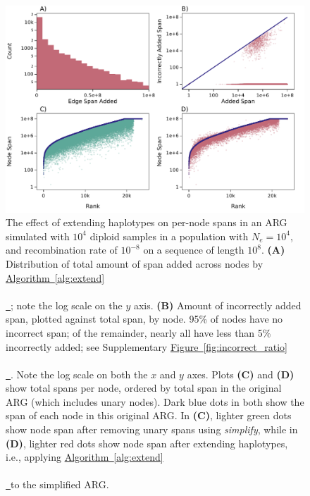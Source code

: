 \documentclass[10pt,twoside,lineno]{gsajnl}
\newcommand{\algorithmref}[2][]{%
	\hyperref[{#2}]{%
		Algorithm~\ref*{#2}%
		\ifx\\#1\\%
		\else
		\,#1%
		\fi
	}%
}
\newcommand*{\figref}[2][]{%
	\hyperref[{#2}]{%
		Figure~\ref*{#2}%
		\ifx\\#1\\%
		\else
		\,#1%
		\fi
	}%
}
\begin{document}
\begin{figure}[!bht]
	\includegraphics[width=\textwidth]{figures/Figure4-plt.pdf}
	\caption{
        The effect of extending haplotypes on per-node spans
        in an ARG simulated with $10^4$ diploid samples in a population with $N_e=10^4$,
        and recombination rate of $10^{-8}$ on a sequence of length $10^8$.
        \textbf{(A)}
        Distribution of total amount of span added across nodes by \algorithmref{alg:extend};
        note the log scale on the $y$ axis.
        \textbf{(B)}
        Amount of incorrectly added span, plotted against total span, by node.
        95\% of nodes have no incorrect span; of the remainder,
        nearly all have less than 5\% incorrectly added;
        see Supplementary \figref{fig:incorrect_ratio}. Note the log scale on both the $x$ and $y$ axes.
        Plots \textbf{(C)} and \textbf{(D)} show total spans per node,
        ordered by total span in the original ARG (which includes unary nodes).
        Dark blue dots in both show the span of each node in this original ARG.
        In \textbf{(C)}, lighter green dots show node
        span after removing unary spans using \textit{simplify},
        while in \textbf{(D)},
        lighter red dots show node span after extending haplotypes,
        i.e., applying \algorithmref{alg:extend} to the simplified ARG.
    }
	\label{fig:node-spans}
\end{figure}
\end{document}
